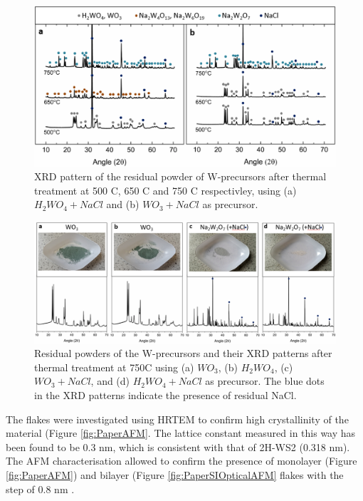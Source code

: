 \begin{figure}[h]
	\begin{center}
		\includegraphics[scale=0.3]{PaperSIXRD.png}
		\caption{XRD pattern of the residual powder of W-precursors after thermal treatment at 500 {\degree}C, 650 {\degree}C and 750 {\degree}C respectivley, using (a) $H_2WO_4+NaCl$ and (b) $WO_3+NaCl$ as precursor.}
		\label{fig:PaperSIXRD}
	\end{center}
\end{figure}

\begin{figure}[h]
		\begin{center}
		\includegraphics[scale=0.3]{PaperSIXRDOptical.png}
		\caption{Residual powders of the W-precursors and their XRD patterns after thermal treatment at 750{\degree}C using (a) $WO_3$, (b) $H_2WO_4$, (c) $WO_3+NaCl$, and (d) $H_2WO_4+NaCl$ as precursor. The blue dots in the XRD patterns indicate the presence of residual NaCl.}
		\label{fig:PaperSIXRDOptical}
	\end{center}
\end{figure}

The flakes were investigated using HRTEM to confirm high crystallinity of the material (Figure \ref{fig:PaperAFM}. The lattice constant measured in this way has been found to be 0.3 nm, which is consistent with that of 2H-WS2 (0.318 nm). The AFM characterisation allowed to confirm the presence of monolayer (Figure \ref{fig:PaperAFM}) and bilayer (Figure \ref{fig:PaperSIOpticalAFM} flakes with the step of 0.8 nm \cite{Wu2014}\cite{Rasmussen2015}.


